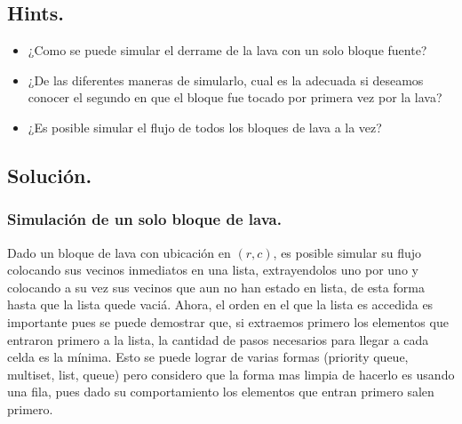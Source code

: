 \documentclass[12pt,letterpaper,titlepage]{article}
\begin{document}
	\subsection{Hints.}
	\begin{itemize}
		\item ¿Como se puede simular el derrame de la lava con un solo bloque fuente? 
		\item ¿De las diferentes maneras de simularlo, cual es la adecuada si deseamos conocer el segundo en que el bloque fue tocado por primera vez por la lava? 
		\item ¿Es posible simular el flujo de todos los bloques de lava a la vez?
	\end{itemize}
	\subsection{Solución.}
	\subsubsection{Simulación de un solo bloque de lava.}
	Dado un bloque de lava con ubicación en $(r,c)$, es posible simular su flujo colocando sus vecinos inmediatos en una lista, extrayendolos uno por uno y colocando a su vez sus vecinos que aun no han estado en lista, de esta forma hasta que la lista quede vaciá. Ahora, el orden en el que la lista es accedida es importante pues se puede demostrar que, si extraemos primero los elementos que entraron primero a la lista, la cantidad de pasos necesarios para llegar a cada celda es la mínima. Esto se puede lograr de varias formas (priority queue, multiset, list, queue) pero considero que la forma mas limpia de hacerlo es usando una fila, pues dado su comportamiento los elementos que entran primero salen primero.
	
\end{document}
